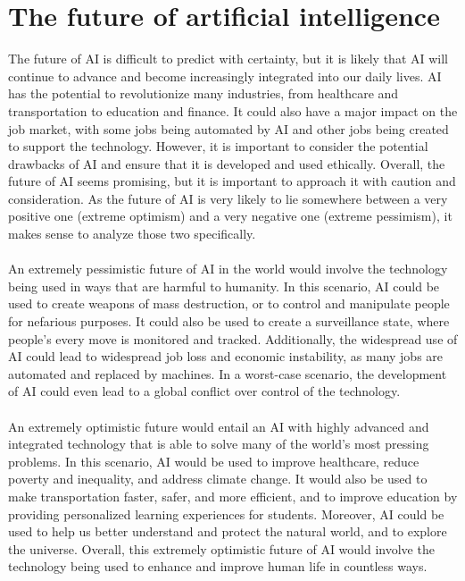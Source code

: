 \section{The future of artificial intelligence}
The future of AI is difficult to predict with certainty,
but it is likely that AI will continue to advance and become 
increasingly integrated into our daily lives. AI has the potential 
to revolutionize many industries, from healthcare and transportation 
to education and finance. It could also have a major impact on the job 
market, with some jobs being automated by AI and other jobs being created 
to support the technology. However, it is important to consider the potential 
drawbacks of AI and ensure that it is developed and used ethically. Overall, 
the future of AI seems promising, but it is important to approach it with caution 
and consideration. As the future of AI is very likely to lie somewhere between a very 
positive one (extreme optimism) and a very negative one (extreme pessimism), it makes sense 
to analyze those two specifically.
\\
\\
An extremely pessimistic future of AI in the world would involve the 
technology being used in ways that are harmful to humanity. In this scenario, 
AI could be used to create weapons of mass destruction, or to control and manipulate 
people for nefarious purposes. It could also be used to create a surveillance state, 
where people's every move is monitored and tracked. Additionally, the widespread use of 
AI could lead to widespread job loss and economic instability, as many jobs are automated 
and replaced by machines. In a worst-case scenario, the development of AI could even lead 
to a global conflict over control of the technology.
\\
\\
An extremely optimistic future would entail an AI with highly advanced and 
integrated technology that is able to solve many of the world's most pressing 
problems. In this scenario, AI would be used to improve healthcare, reduce poverty 
and inequality, and address climate change. It would also be used to make transportation 
faster, safer, and more efficient, and to improve education by providing personalized learning 
experiences for students. Moreover, AI could be used to help us better understand and protect the 
natural world, and to explore the universe. Overall, this extremely optimistic future of AI would 
involve the technology being used to enhance and improve human life in countless ways.



